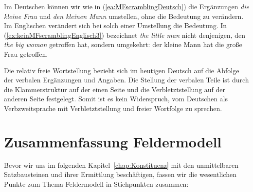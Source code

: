 Im Deutschen können wir wie in (\ref{ea:MFscramblingDeutsch}) die Ergänzungen \textit{die kleine Frau} und \textit{den kleinen Mann} umstellen, ohne die Bedeutung zu verändern. Im Englischen verändert sich bei solch einer Umstellung die Bedeutung. In (\ref{ex:keinMFscramblingEnglisch3}) bezeichnet \textit{the little man} nicht denjenigen, den \textit{the big woman} getroffen hat, sondern umgekehrt: der kleine Mann hat die große Frau getroffen. 

\ea
{}\label{ea:MFscramblingDeutsch}
\label{ex:keinMFscramblingEnglisch3}
\z 
\z 

Die relativ freie Wortstellung bezieht sich im heutigen Deutsch auf die Abfolge der verbalen Ergänzungen und Angaben. Die Stellung der verbalen Teile ist durch die Klammerstruktur auf der einen Seite und die Verbletztstellung auf der anderen Seite festgelegt. Somit ist es kein Widerspruch, vom Deutschen als Verbzweitsprache mit Verbletztstellung und freier Wortfolge zu sprechen.

\section{Zusammenfassung Feldermodell}\label{section:Zfsg_Feldermodell}

Bevor wir uns im folgenden Kapitel~\ref{chap:Konstituenz} mit den unmittelbaren Satzbausteinen und ihrer Ermittlung beschäftigen, fassen wir die wesentlichen Punkte zum Thema Feldermodell in Stichpunkten zusammen:

